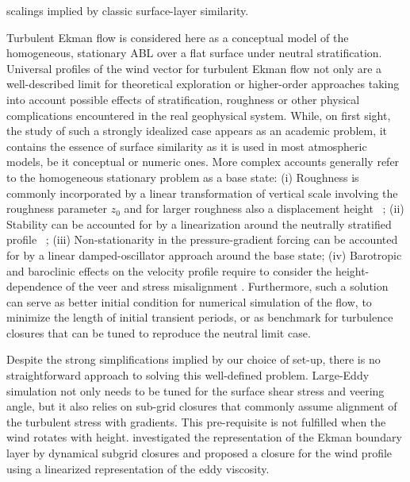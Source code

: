 \documentclass[smallcondensed,final]{svjour3}
\begin{document}
scalings implied by classic surface-layer similarity.
%
\par
%
Turbulent Ekman flow is considered here as a conceptual model of the
homogeneous, stationary ABL over a flat surface under neutral stratification. 
%
Universal profiles of the wind vector for turbulent Ekman flow not only are a well-described limit
for theoretical exploration or higher-order approaches taking into account possible effects of stratification,
roughness or other physical complications encountered in the real geophysical system.
%
While, on first sight, the study of such a strongly idealized case appears as an academic problem, it contains the essence
of surface similarity as it is used in most atmospheric models, be it conceptual or numeric ones.
%
More complex accounts generally refer to the homogeneous stationary problem as a base state: 
%
(i) Roughness is commonly incorporated by a linear transformation of vertical scale involving the
roughness parameter $z_0$ and for larger roughness also a displacement height~%
\citep{monin:1975,jacobs:AFM1988,hogstrom:BM1988};
%
(ii) Stability can be accounted for by a linearization around the neutrally stratified profile~%
\citep{monin:ARF1970, monin:1975, hogstrom:BM1988, hogstrom:BM1996,sakagami:BM2020};
%
(iii) Non-stationarity in the pressure-gradient forcing can be accounted for by a linear damped-oscillator
approach around the base state\citep{momen:JAS2016}; 
%
(iv) Barotropic and baroclinic effects on the velocity profile require to consider 
the height-dependence of the veer and stress misalignment \citep{momen:JAS2018, ghannam:QJR2021}.
% 
Furthermore, such a solution can serve as better initial condition for numerical simulation of the flow,
to minimize the length of initial transient periods, or as benchmark for turbulence
closures that can be tuned to reproduce the neutral limit case.
%
\par
%
Despite the strong simplifications implied by our choice of set-up, there is no straightforward approach to solving
this well-defined problem.
%
Large-Eddy simulation not only needs to be tuned for the surface shear stress and veering angle, but it also
relies on sub-grid closures that commonly assume alignment of the turbulent stress with gradients.
%
This pre-requisite is not fulfilled when the wind rotates with height.
%
\citet{esau:EFM2004} investigated the representation of the Ekman boundary layer by dynamical subgrid closures
and \cite{zikanov:JFM2003} proposed a closure for the wind profile using a linearized representation of the eddy viscosity.
%
\end{document}
